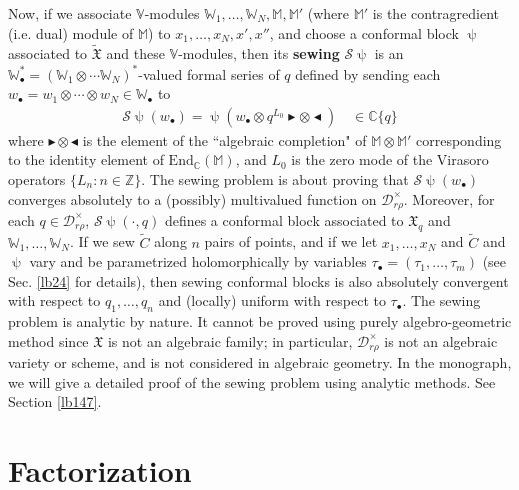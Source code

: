\documentclass[12pt,a4paper,notitlepage]{report}
\theoremstyle{definition}
\theoremstyle{plain}
\newcommand{\fk}{\mathfrak}
\newcommand{\mc}{\mathcal}
\newcommand{\wtd}{\widetilde}
\newcommand{\End}{\mathrm{End}} %
\newcommand{\blt}{\bullet}
\newcommand{\Vbb}{\mathbb V}
\newcommand{\Wbb}{\mathbb W}
\newcommand{\Mbb}{\mathbb M}
\newcommand{\Cbb}{\mathbb C}
\newcommand{\Zbb}{\mathbb Z}
\newcommand{\btl}{\blacktriangleleft}
\newcommand{\btr}{\blacktriangleright}
\numberwithin{equation}{section}
\begin{document}
Now, if we associate $\Vbb$-modules $\Wbb_1,\dots,\Wbb_N,\Mbb,\Mbb'$ (where $\Mbb'$ is the contragredient (i.e. dual) module of $\Mbb$) to $x_1,\dots,x_N,x',x''$, and choose a conformal block $\uppsi$ associated to $\wtd{\fk X}$ and these $\Vbb$-modules, then its \textbf{sewing} $\mc S\uppsi$ is an $\Wbb_\blt^*=(\Wbb_1\otimes\cdots\Wbb_N)^*$-valued formal series of $q$ defined by sending each $w_\blt=w_1\otimes\cdots\otimes w_N\in\Wbb_\blt$ to
\begin{align*}
\mc S\uppsi(w_\blt)=\uppsi(w_\blt\otimes q^{L_0}\btr\otimes\btl)\quad\in\Cbb\{q\}
\end{align*}
where $\btr\otimes\btl$ is the element of the ``algebraic completion" of $\Mbb\otimes\Mbb'$ corresponding to the identity element of $\End_\Cbb(\Mbb)$, and $L_0$ is the zero mode of the Virasoro operators $\{L_n:n\in\Zbb\}$. The sewing problem is about proving that $\mc S\uppsi(w_\blt)$ converges absolutely to a (possibly) multivalued function on $\mc D_{r\rho}^\times$. Moreover, for each $q\in\mc D_{r\rho}^\times$, $\mc S\uppsi(\cdot,q)$ defines a conformal block associated to $\fk X_q$ and $\Wbb_1,\dots,\Wbb_N$. If we sew $\wtd C$ along $n$ pairs of points, and if we let  $x_1,\dots,x_N$ and  $\wtd C$ and $\uppsi$    vary and be parametrized holomorphically by variables $\tau_\blt=(\tau_1,\dots,\tau_m)$ (see Sec. \ref{lb24} for details), then  sewing  conformal blocks is also absolutely  convergent with respect to $q_1,\dots,q_n$ and (locally) uniform with respect to $\tau_\blt$. 	The sewing problem is analytic by nature. It cannot be proved using purely algebro-geometric method since $\fk X$ is not an algebraic family; in particular, $\mc D_{r\rho}^\times$ is not an algebraic variety or scheme, and is not considered in algebraic geometry. In the monograph, we will give a detailed proof of the  sewing problem using analytic methods. See Section \ref{lb147}.
	

	



\section*{Factorization}
\end{document}
